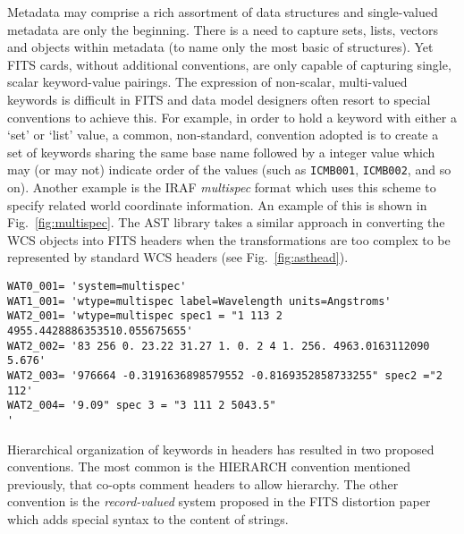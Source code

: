 \documentclass[final,authoryear,5p,times,twocolumn]{elsarticle}
\begin{document}
Metadata may comprise a rich assortment of data structures and
single-valued metadata are only the beginning. There is a need to
capture sets, lists, vectors and objects within metadata (to name only
the most basic of structures). Yet FITS cards, without additional
conventions, are only capable of capturing single, scalar
keyword-value pairings. The expression of non-scalar, multi-valued
keywords is difficult in FITS and data model designers often resort to
special conventions to achieve this. For example, in order to hold a
keyword with either a `set' or `list' value, a common, non-standard,
convention adopted is to create a set of keywords sharing the same
base name followed by a integer value which may (or may not) indicate
order of the values (such as \texttt{ICMB001}, \texttt{ICMB002}, and
so on). Another example is the IRAF \textit{multispec} format
\citep[see][and references therein]{1993ASPC...52..467V} which uses
this scheme to specify related world coordinate information. An
example of this is shown in Fig.\ \ref{fig:multispec}. The AST library
\citep[][and see also \S\ref{sec:wcs}]{1998ASPC..145...41W} takes a
similar approach in converting the WCS objects into FITS headers when
the transformations are too complex to be represented by standard WCS
headers (see Fig.\ \ref{fig:asthead}).

\begin{figure*}
\begin{minipage}{\textwidth}
\begin{center}
\begin{verbatim}
WAT0_001= 'system=multispec'
WAT1_001= 'wtype=multispec label=Wavelength units=Angstroms'
WAT2_001= 'wtype=multispec spec1 = "1 113 2 4955.4428886353510.055675655'
WAT2_002= '83 256 0. 23.22 31.27 1. 0. 2 4 1. 256. 4963.0163112090 5.676'
WAT2_003= '976664 -0.3191636898579552 -0.8169352858733255" spec2 ="2 112'
WAT2_004= '9.09" spec 3 = "3 111 2 5043.5"                              '
\end{verbatim}
\end{center}
\caption{Example header from an IRAF \textit{multispec} data set
  indicating the use of multi-line headers..}
\label{fig:multispec}
\end{minipage}
\end{figure*}

Hierarchical organization of keywords in headers has resulted in two
proposed conventions. The most common is the HIERARCH convention
mentioned previously, that co-opts comment headers to allow
hierarchy. The other convention is the \emph{record-valued} system
proposed in the FITS distortion paper \citep{FITSDistort} which
adds special syntax to the content of strings.
\end{document}
